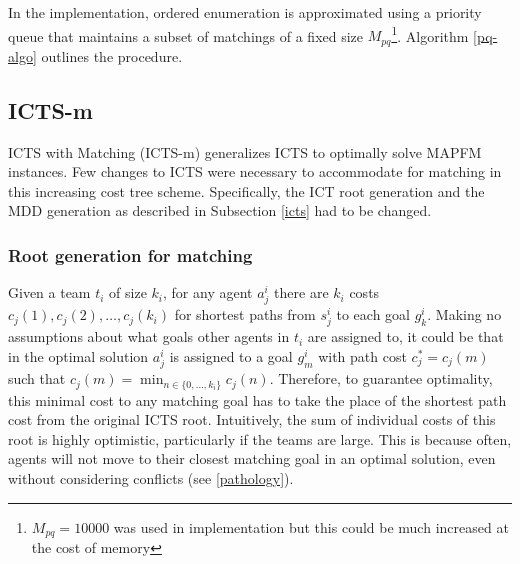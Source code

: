 \documentclass[english]{article}
\begin{document}
	In the implementation, ordered enumeration is approximated using a priority queue that maintains a subset of matchings of a fixed size $M_{pq}$\footnote{$M_{pq} = 10000$ was used in implementation but this could be much increased at the cost of memory}. Algorithm \ref{pq-algo} outlines the procedure.
	
	\subsection{ICTS-m}
	ICTS with Matching (ICTS-m) generalizes ICTS to optimally solve MAPFM instances. Few changes to ICTS were necessary to accommodate for matching in this increasing cost tree scheme. Specifically, the ICT root generation and the MDD generation as described in Subsection \ref{icts} had to be changed.
	\subsubsection{Root generation for matching}
	Given a team $t_i$ of size $k_i$, for any agent $a_j^i$ there are $k_i$ costs $c_j(1),c_j(2),\ldots,c_j(k_i)$ for shortest paths from $s_j^i$ to each goal $g_k^i$. Making no assumptions about what goals other agents in $t_i$ are assigned to, it could be that in the optimal solution $a_j^i$ is assigned to a goal $g_{m}^i$ with path cost $c^*_j = c_j(m)$ such that $c_j(m) = \min_{n\in\{0,\ldots,k_i\}} c_j(n)$. Therefore, to guarantee optimality, this minimal cost to any matching goal has to take the place of the shortest path cost from the original ICTS root. Intuitively, the sum of individual costs of this root is highly optimistic, particularly if the teams are large. This is because often, agents will not move to their closest matching goal in an optimal solution, even without considering conflicts (see \ref{pathology}).
	
\end{document}
